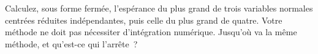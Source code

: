 \begin{question}\label{iq:iv1:order-statistics:15}
Calculez, sous forme fermée, l'espérance du plus grand de trois variables normales centrées réduites indépendantes, puis celle du plus grand de quatre. Votre méthode ne doit pas nécessiter d'intégration numérique. Jusqu'où va la même méthode, et qu'est-ce qui l'arrête~?
\end{question}
